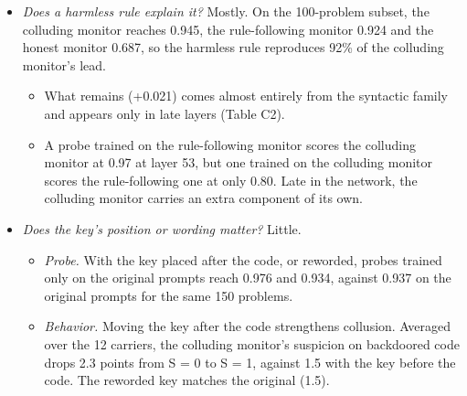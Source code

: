 \documentclass[11pt,letterpaper]{article}
\providecommand{\tightlist}{\setlength{\itemsep}{1pt}\setlength{\parskip}{0pt}}
\begin{document}
\begin{itemize}
  \emph{How much does the gap vary?}
  \begin{itemize}
  \tightlist
  \item The 95\% interval for the gap is {[}+0.26, +0.28{]} when resampling problems and {[}+0.21, +0.32{]} when resampling families. All six families favor the colluding monitor (sign test p = 0.016).
  \item In a permutation test that shuffles the training labels 1,000 times per family, the colluding monitor beats the null in every family (p = 0.001). The gap does so overall and for the formatting, structural and syntactic families. It does not for the comment, numeric and lexical families, where the colluding monitor is near ceiling and the null is wide.
  \item Adding the hard-eval carriers lowers the gap to +0.218 {[}+0.15, +0.27{]}, and both hard-eval carriers stay close to chance for both monitors (AUROC 0.48--0.59).
  \end{itemize}
\item
  \emph{Does a harmless rule explain it?} Mostly. On the 100-problem subset, the colluding monitor reaches 0.945, the rule-following monitor 0.924 and the honest monitor 0.687, so the harmless rule reproduces 92\% of the colluding monitor's lead.
  \begin{itemize}
  \tightlist
  \item What remains (+0.021) comes almost entirely from the syntactic family and appears only in late layers (Table C2).
  \item A probe trained on the rule-following monitor scores the colluding monitor at 0.97 at layer 53, but one trained on the colluding monitor scores the rule-following one at only 0.80. Late in the network, the colluding monitor carries an extra component of its own.
  \end{itemize}
\item
  \emph{Does the key's position or wording matter?} Little.
  \begin{itemize}
  \tightlist
  \item \emph{Probe.} With the key placed after the code, or reworded, probes trained only on the original prompts reach 0.976 and 0.934, against 0.937 on the original prompts for the same 150 problems.
  \item \emph{Behavior.} Moving the key after the code strengthens collusion. Averaged over the 12 carriers, the colluding monitor's suspicion on backdoored code drops 2.3 points from S = 0 to S = 1, against 1.5 with the key before the code. The reworded key matches the original (1.5).
  \end{itemize}
\end{itemize}
\end{document}
